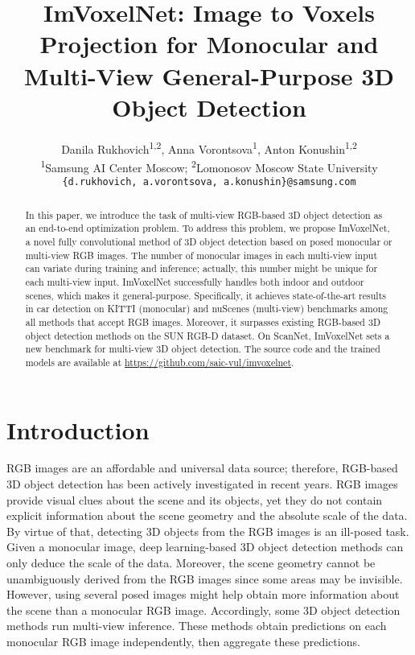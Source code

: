 \documentclass[10pt,twocolumn,letterpaper]{article}
\begin{document}
\title{ImVoxelNet: Image to Voxels Projection for Monocular and Multi-View General-Purpose 3D Object Detection}

\author{
Danila Rukhovich\textsuperscript{1,2}, Anna Vorontsova\textsuperscript{1}, Anton Konushin\textsuperscript{1,2} \\
\textsuperscript{1}Samsung AI Center Moscow; \textsuperscript{2}Lomonosov Moscow State University \\
{\tt \small \{d.rukhovich,\ a.vorontsova,\ a.konushin\}@samsung.com}}

\maketitle


\begin{abstract}
In this paper, we introduce the task of multi-view RGB-based 3D object detection as an end-to-end optimization problem. To address this problem, we propose ImVoxelNet, a novel fully convolutional method of 3D object detection based on posed monocular or multi-view RGB images. The number of monocular images in each multi-view input can variate during training and inference; actually, this number might be unique for each multi-view input. ImVoxelNet successfully handles both indoor and outdoor scenes, which makes it general-purpose. Specifically, it achieves state-of-the-art results in car detection on KITTI (monocular) and nuScenes (multi-view) benchmarks among all methods that accept RGB images. Moreover, it surpasses existing RGB-based 3D object detection methods on the SUN RGB-D dataset. On ScanNet, ImVoxelNet sets a new benchmark for multi-view 3D object detection. The source code and the trained models are available at \url{https://github.com/saic-vul/imvoxelnet}.
\end{abstract}

\section{Introduction}

RGB images are an affordable and universal data source; therefore, RGB-based 3D object detection has been actively investigated in recent years. RGB images provide visual clues about the scene and its objects, yet they do not contain explicit information about the scene geometry and the absolute scale of the data. By virtue of that, detecting 3D objects from the RGB images is an ill-posed task. Given a monocular image, deep learning-based 3D object detection methods can only deduce the scale of the data. Moreover, the scene geometry cannot be unambiguously derived from the RGB images since some areas may be invisible. However, using several posed images might help obtain more information about the scene than a monocular RGB image. Accordingly, some 3D object detection methods \cite{simonelli2020disentangling, roddick2018orthographic} run multi-view inference. These methods obtain predictions on each monocular RGB image independently, then aggregate these predictions.
\end{document}
